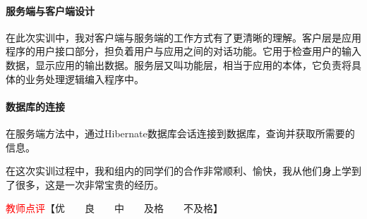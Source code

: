 \documentclass{article}
\begin{document}
\paragraph{服务端与客户端设计}
在此次实训中，我对客户端与服务端的工作方式有了更清晰的理解。客户层是应用程序的用户接口部分，担负着用户与应用之间的对话功能。它用于检查用户的输入数据，显示应用的输出数据。服务层又叫功能层，相当于应用的本体，它负责将具体的业务处理逻辑编入程序中。

\paragraph{数据库的连接}
在服务端方法中，通过Hibernate数据库会话连接到数据库，查询并获取所需要的信息。

在这次实训过程中，我和组内的同学们的合作非常顺利、愉快，我从他们身上学到了很多，这是一次非常宝贵的经历。

\vfill
\noindent\textcolor{red}{教师点评}【优~~~~良~~~~中~~~~及格~~~~不及格】
\end{document}

